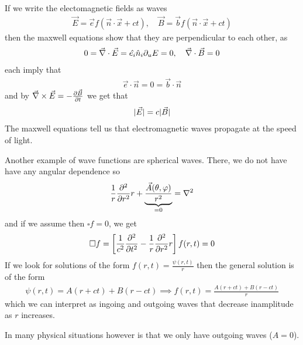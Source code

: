 If we write the electomagnetic fields as waves
\begin{align*}
  \vec{E} = \vec{e} f(\vec{n} \cdot \vec{x} + ct), \quad \vec{B} = \vec{b} f(\vec{n} \cdot \vec{x} + ct)
\end{align*}
then the maxwell equations show that they are perpendicular to each other, as
\begin{align*}
  0 = \vec{\nabla} \cdot \vec{E} = \hat{e_i}\hat{n}_i \partial_u E = 0, \quad \vec{\nabla} \cdot \vec{B} = 0
\end{align*}
each imply that
\begin{align*}
 \vec{e} \cdot \vec{n} = 0 = \vec{b} \cdot \vec{n} 
\end{align*}
and by $\vec{\nabla} \times \vec{E} = - \frac{\partial \vec{B}}{\partial t}$ we get that
\begin{align*}
  \vert\vec{E}\vert = c \vert\vec{B}\vert
\end{align*}
The maxwell equations tell us that electromagnetic waves propagate at the speed of light.

Another example of wave functions are spherical waves.
There, we do not have have any angular dependence so
\begin{align*}
  \frac{1}{r} \frac{\partial^{2}}{\partial r^{2}}r + \underbrace{\frac{\vec{A}(\theta,\varphi)}{r^{2}}}_{=0} = \nabla^{2}
\end{align*}
and if we assume then $\square f = 0$, we get
\begin{align*}
  \square f = \left[\frac{1}{c^{2}} \frac{\partial^{2}}{\partial t^{2}} - \frac{1}{r}\frac{\partial^{2}}{\partial r^{2}}r\right]f(r,t) = 0
\end{align*}
If we look for solutions of the form $f(r,t) = \frac{\psi(r,t)}{r}$ then the general solution is of the form
\begin{align*}
  \psi(r,t) = A(r + ct) + B(r - ct) \implies f(r,t) = \frac{A(r+ct) + B(r - ct)}{r}
\end{align*}
which we can interpret as ingoing and outgoing waves that decrease inamplitude as $r$ increases.

In many physical situations however is that we only have outgoing waves ($A = 0$).


